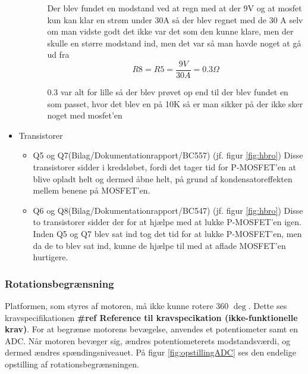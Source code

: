 \begin{itemize}
\begin{itemize}
\begin{itemize}
		Der blev fundet en modstand ved at regn med at der 9V og at mosfet kun kan klar en strøm under 30A så der blev regnet med de 30 A selv om man vidste godt det ikke var det som den kunne klare, men der skulle en større modstand ind, men det var så man havde noget at gå ud fra 
		\begin{displaymath}
		R8=R5=\frac {9V}{30A} =0.3\Omega
		\end{displaymath}
		
		
		0.3 var alt for lille så der blev prøvet op end til der blev fundet en som passet, hvor det blev en på 10K så er man sikker på der ikke sker noget med mosfet’en 
		
		
	\end{itemize}
\end{itemize}

\item Transistorer
\begin{itemize}
	\item Q5 og Q7(Bilag/Dokumentationrapport/BC557) (jf. figur \ref{fig:hbro})
	Disse transistorer sidder i kredsløbet, fordi det tager tid for P-MOSFET'en at blive opladt helt og dermed åbne helt, på grund af kondensatoreffekten mellem benene på MOSFET'en.
	
	\item Q6 og Q8(Bilag/Dokumentationrapport/BC547) (jf. figur \ref{fig:hbro})
	Disse to transistorer sidder der for at hjælpe med at lukke P-MOSFET'en igen. Inden Q5 og Q7 blev sat ind tog det tid for at lukke P-MOSFET'en, men da de to blev sat ind, kunne de hjælpe til med at aflade MOSFET'en hurtigere. 
\end{itemize}
\end{itemize}

\subsubsection{Rotationsbegrænsning}
Platformen, som styres af motoren, må ikke kunne rotere 360 \(\deg\). Dette ses kravspecifikationen \textbf{\#ref Reference til kravspecikation (ikke-funktionelle krav)}. For at begrænse motorens bevægelse, anvendes et potentiometer samt en ADC. Når motoren bevæger sig, ændres potentiometerets modstandsværdi, og dermed ændres spændingsniveauet. På figur \ref{fig:opstillingADC} ses den endelige opstilling af rotationsbegrænsningen.

